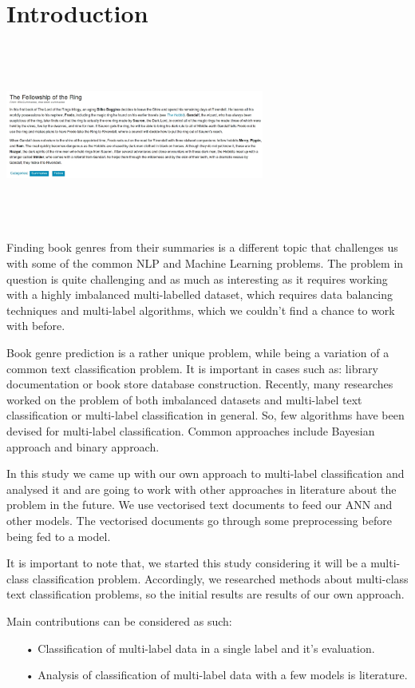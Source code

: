 \documentclass{article}
\begin{document}
\section{Introduction}

\includegraphics[width=8.5cm, height=6cm]{lotr}

Finding book genres from their summaries is a different topic that challenges us with some of the  common NLP and Machine Learning problems. The problem in question is quite challenging and as much as interesting as it requires working with a highly imbalanced multi-labelled dataset, which requires data balancing techniques and multi-label algorithms, which we couldn't find a chance to work with before.

Book genre prediction is a rather unique problem, while being a variation of a common text classification problem. It is important in cases such as: library documentation or book store database construction. Recently, many researches worked on the problem of both imbalanced datasets and multi-label text classification or multi-label classification in general. So, few algorithms have been devised for multi-label classification. Common approaches include Bayesian approach and binary approach.

In this study we came up with our own approach to multi-label classification and analysed it and are going to work with other approaches in literature about the problem in the future. We use vectorised text documents to feed our ANN and other models. The vectorised documents go through some preprocessing before being fed to a model.

It is important to note that, we started this study considering it will be a multi-class classification problem. Accordingly, we researched methods about multi-class text classification problems, so the initial results are results of our own approach.

Main contributions can be considered as such:
\begin{itemize}
\item[•] Classification of multi-label data in a single label and it's evaluation.
\item[•] Analysis of classification of multi-label data with a few models is literature.
\end{itemize}
\end{document}
